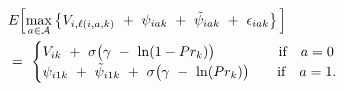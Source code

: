 \begin{equation}
\begin{split}
	& E\Big[ \underset{a \in \mathcal{A}}{\max} \left\{ V_{i,\ell(i, a, k)} \ + \ \psi_{iak} \ + \ \tilde{\psi}_{iak} \ + \ \epsilon_{iak} \right\} \Big] \\
	& = \ 
	\begin{cases}
		V_{ik} \ + \ \sigma \big( \gamma \ - \ \ln(1 - Pr_{k}) \big) \hspace{1.6cm} \text{if \ \ $a = 0$} \\
		\psi_{i1k} \ + \ \tilde{\psi}_{i1k} \ + \ \sigma \big( \gamma \ - \ \ln(Pr_{k}) \big) \hspace{0.7cm} \text{if \ \ $a = 1$}.
	\end{cases}
\end{split}
\label{Equation:Firms-Problem_Emax}
\end{equation}